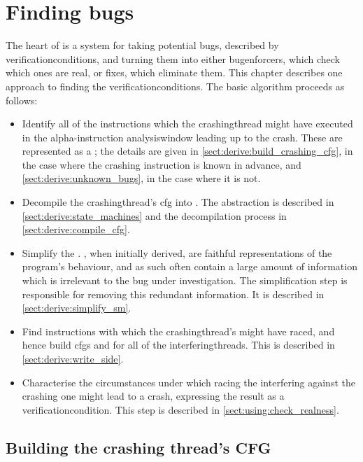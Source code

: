 \chapter{Finding bugs}
\label{sect:derive}

The heart of {\technique} is a system for taking potential bugs,
described by \glspl{verificationcondition}, and turning them into
either \glspl{bugenforcer}, which check which ones are real, or fixes,
which eliminate them.  This chapter describes one approach to finding
the \glspl{verificationcondition}.  The basic algorithm proceeds as
follows:
\begin{itemize}
\item Identify all of the instructions which the \gls{crashingthread}
  might have executed in the \gls{alpha}-instruction
  \gls{analysiswindow} leading up to the crash.  These are represented
  as a ; the
  details are given in \autoref{sect:derive:build_crashing_cfg}, in
  the case where the crashing instruction is known in advance, and
  \autoref{sect:derive:unknown_bugs}, in the case where it is not.
\item Decompile the \gls{crashingthread}'s \gls{cfg} into
  {\AStateMachine}.  The {\StateMachine} abstraction is described in
  \autoref{sect:derive:state_machines} and the decompilation process
  in \autoref{sect:derive:compile_cfg}.
\item Simplify the {\StateMachine}.  {\STateMachines}, when initially
  derived, are faithful representations of the program's behaviour,
  and as such often contain a large amount of information which is
  irrelevant to the bug under investigation.  The simplification step
  is responsible for removing this redundant information.  It is
  described in \autoref{sect:derive:simplify_sm}.
\item Find instructions with which the \gls{crashingthread}'s
  {\StateMachine} might have raced, and hence build \glspl{cfg} and
  {\StateMachines} for all of the \glspl{interferingthread}.  This is
  described in \autoref{sect:derive:write_side}.
\item Characterise the circumstances under which racing the
  interfering {\StateMachines} against the crashing one might lead to
  a crash, expressing the result as a \gls{verificationcondition}.
  This step is described in \autoref{sect:using:check_realness}.
\end{itemize}

\section{Building the crashing thread's CFG}
\label{sect:derive:build_crashing_cfg}

